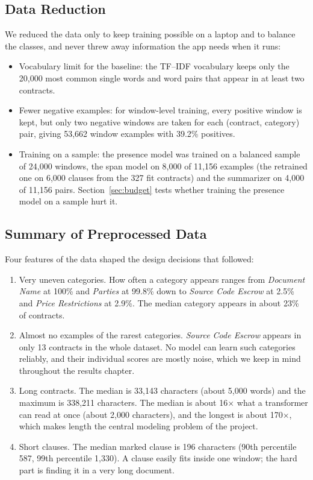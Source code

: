 \subsection{Data Reduction}
We reduced the data only to keep training possible on a laptop and to balance the classes, and never threw away information the app needs when it runs:
\begin{itemize}[itemsep=2pt]
  \item Vocabulary limit for the baseline: the TF--IDF vocabulary keeps only the 20{,}000 most common single words and word pairs that appear in at least two contracts.
  \item Fewer negative examples: for window-level training, every positive window is kept, but only two negative windows are taken for each (contract, category) pair, giving 53{,}662 window examples with 39.2\% positives.
  \item Training on a sample: the presence model was trained on a balanced sample of 24{,}000 windows, the span model on 8{,}000 of 11{,}156 examples (the retrained one on 6{,}000 clauses from the 327 fit contracts) and the summarizer on 4{,}000 of 11{,}156 pairs. Section~\ref{sec:budget} tests whether training the presence model on a sample hurt it.
\end{itemize}

\subsection{Summary of Preprocessed Data}
\label{sec:eda}
Four features of the data shaped the design decisions that followed:

\begin{enumerate}[itemsep=2pt]
  \item Very uneven categories. How often a category appears ranges from \emph{Document Name} at 100\% and \emph{Parties} at 99.8\% down to \emph{Source Code Escrow} at 2.5\% and \emph{Price Restrictions} at 2.9\%. The median category appears in about 23\% of contracts.
  \item Almost no examples of the rarest categories. \emph{Source Code Escrow} appears in only 13 contracts in the whole dataset. No model can learn such categories reliably, and their individual scores are mostly noise, which we keep in mind throughout the results chapter.
  \item Long contracts. The median is 33{,}143 characters (about 5{,}000 words) and the maximum is 338{,}211 characters. The median is about 16$\times$ what a transformer can read at once (about 2{,}000 characters), and the longest is about 170$\times$, which makes length the central modeling problem of the project.
  \item Short clauses. The median marked clause is 196 characters (90th percentile 587, 99th percentile 1{,}330). A clause easily fits inside one window; the hard part is finding it in a very long document.
\end{enumerate}

